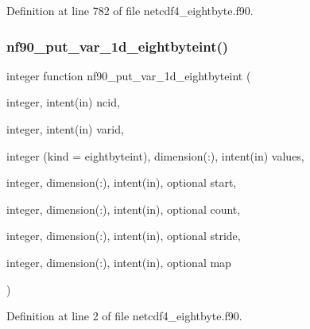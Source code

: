 Definition at line 782 of file netcdf4\+\_\+eightbyte.\+f90.

\mbox{\label{netcdf4__eightbyte_8f90_a47c837921b0c4c1085340afa2908bd27}} 
\subsubsection{\texorpdfstring{nf90\+\_\+put\+\_\+var\+\_\+1d\+\_\+eightbyteint()}{nf90\_put\_var\_1d\_eightbyteint()}}
{\footnotesize\ttfamily integer function nf90\+\_\+put\+\_\+var\+\_\+1d\+\_\+eightbyteint (\begin{DoxyParamCaption}\item[{integer, intent(in)}]{ncid,  }\item[{integer, intent(in)}]{varid,  }\item[{integer (kind = eightbyteint), dimension(\+:), intent(in)}]{values,  }\item[{integer, dimension(\+:), intent(in), optional}]{start,  }\item[{integer, dimension(\+:), intent(in), optional}]{count,  }\item[{integer, dimension(\+:), intent(in), optional}]{stride,  }\item[{integer, dimension(\+:), intent(in), optional}]{map }\end{DoxyParamCaption})}



Definition at line 2 of file netcdf4\+\_\+eightbyte.\+f90.

\mbox{\label{netcdf4__eightbyte_8f90_a5f74fbc3c4b758731991344b922e79f9}} 
